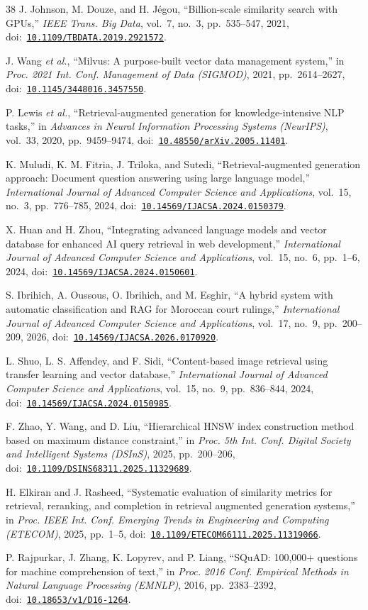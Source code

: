 \documentclass[conference, letterpaper]{IEEEtran}
\newcommand{\doi}[1]{doi:~\href{https://doi.org/#1}{\nolinkurl{#1}}}
\newcommand{\ijacsa}{\textit{International Journal of Advanced Computer Science and Applications}}
\begin{document}
\begin{thebibliography}{38}
J. Johnson, M. Douze, and H. J\'egou, ``Billion-scale similarity search with GPUs,'' \textit{IEEE Trans. Big Data}, vol.~7, no.~3, pp.~535--547, 2021, \doi{10.1109/TBDATA.2019.2921572}.

J. Wang \textit{et al.}, ``Milvus: A purpose-built vector data management system,'' in \textit{Proc. 2021 Int. Conf. Management of Data (SIGMOD)}, 2021, pp.~2614--2627, \doi{10.1145/3448016.3457550}.

P. Lewis \textit{et al.}, ``Retrieval-augmented generation for knowledge-intensive NLP tasks,'' in \textit{Advances in Neural Information Processing Systems (NeurIPS)}, vol.~33, 2020, pp.~9459--9474, \doi{10.48550/arXiv.2005.11401}.

K. Muludi, K. M. Fitria, J. Triloka, and Sutedi, ``Retrieval-augmented generation approach: Document question answering using large language model,'' \ijacsa, vol.~15, no.~3, pp.~776--785, 2024, \doi{10.14569/IJACSA.2024.0150379}.

X. Huan and H. Zhou, ``Integrating advanced language models and vector database for enhanced AI query retrieval in web development,'' \ijacsa, vol.~15, no.~6, pp.~1--6, 2024, \doi{10.14569/IJACSA.2024.0150601}.

S. Ibrihich, A. Oussous, O. Ibrihich, and M. Esghir, ``A hybrid system with automatic classification and RAG for Moroccan court rulings,'' \ijacsa, vol.~17, no.~9, pp.~200--209, 2026, \doi{10.14569/IJACSA.2026.0170920}.

L. Shuo, L. S. Affendey, and F. Sidi, ``Content-based image retrieval using transfer learning and vector database,'' \ijacsa, vol.~15, no.~9, pp.~836--844, 2024, \doi{10.14569/IJACSA.2024.0150985}.

F. Zhao, Y. Wang, and D. Liu, ``Hierarchical HNSW index construction method based on maximum distance constraint,'' in \textit{Proc. 5th Int. Conf. Digital Society and Intelligent Systems (DSInS)}, 2025, pp.~200--206, \doi{10.1109/DSINS68311.2025.11329689}.

H. Elkiran and J. Rasheed, ``Systematic evaluation of similarity metrics for retrieval, reranking, and completion in retrieval augmented generation systems,'' in \textit{Proc. IEEE Int. Conf. Emerging Trends in Engineering and Computing (ETECOM)}, 2025, pp.~1--5, \doi{10.1109/ETECOM66111.2025.11319066}.

P. Rajpurkar, J. Zhang, K. Lopyrev, and P. Liang, ``SQuAD: 100,000+ questions for machine comprehension of text,'' in \textit{Proc. 2016 Conf. Empirical Methods in Natural Language Processing (EMNLP)}, 2016, pp.~2383--2392, \doi{10.18653/v1/D16-1264}.


\end{thebibliography}
\end{document}
